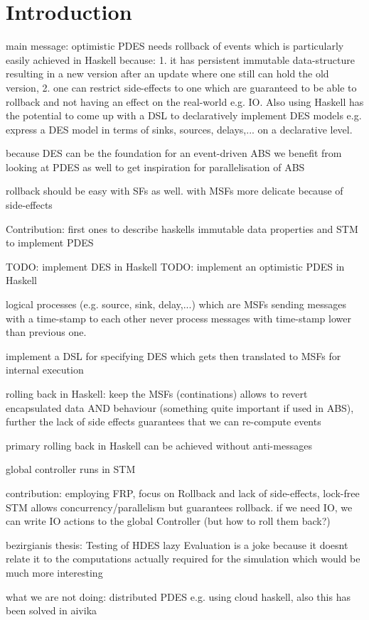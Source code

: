 \section{Introduction}
main message: optimistic PDES needs rollback of events which is particularly easily achieved in Haskell because: 1. it has persistent immutable data-structure resulting in a new version after an update where one still can hold the old version, 2. one can restrict side-effects to one which are guaranteed to be able to rollback and not having an effect on the real-world e.g. IO. Also using Haskell has the potential to come up with a DSL to declaratively implement DES models e.g. express a DES model in terms of sinks, sources, delays,... on a declarative level.

because DES can be the foundation for an event-driven ABS we benefit from looking at PDES as well to get inspiration for parallelisation of ABS

rollback should be easy with SFs as well. with MSFs more delicate because of side-effects

Contribution: first ones to describe haskells immutable data properties and STM to implement PDES

TODO: implement DES in Haskell
TODO: implement an optimistic PDES in Haskell

logical processes (e.g. source, sink, delay,...) which are MSFs sending messages with a time-stamp to each other never process messages with time-stamp lower than previous one.

implement a DSL for specifying DES which gets then translated to MSFs for internal execution

rolling back in Haskell: keep the MSFs (continations) allows to revert encapsulated data AND behaviour (something quite important if used in ABS), further the lack of side effects guarantees that we can re-compute events

primary rolling back in Haskell can be achieved without anti-messages

global controller runs in STM

contribution: employing FRP, focus on Rollback and lack of side-effects, lock-free STM allows concurrency/parallelism but guarantees rollback. if we need IO, we can write IO actions to the global Controller (but how to roll them back?)

bezirgianis thesis: Testing of HDES lazy Evaluation is a joke because it doesnt relate it to the computations actually required for the simulation which would be much more interesting

what we are not doing: distributed PDES e.g. using cloud haskell, also this has been solved in aivika